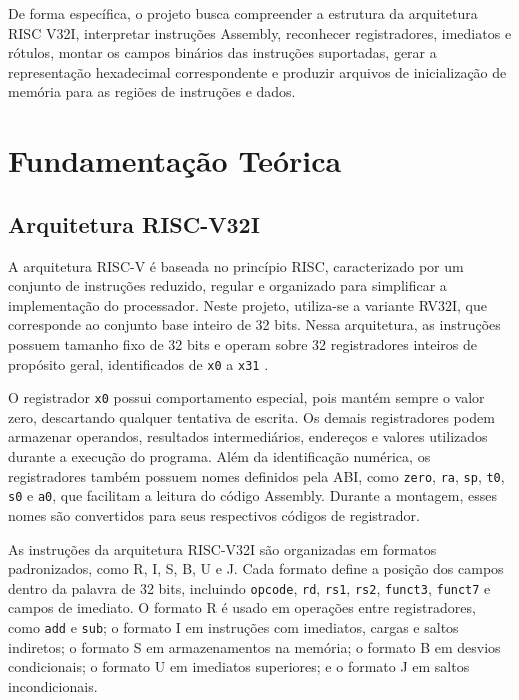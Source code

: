 \documentclass[conference]{IEEEtran}
\begin{document}
De forma espec\'{i}fica, o projeto busca compreender a estrutura da arquitetura RISC V32I, interpretar instru\c{c}\~{o}es Assembly, reconhecer registradores, imediatos e r\'{o}tulos, montar os campos bin\'{a}rios das instru\c{c}\~{o}es suportadas, gerar a representa\c{c}\~{a}o hexadecimal correspondente e produzir arquivos de inicializa\c{c}\~{a}o de mem\'{o}ria para as regi\~{o}es de instru\c{c}\~{o}es e dados.


\section{Fundamentação Teórica}

\subsection{Arquitetura RISC-V32I}

A arquitetura RISC-V é baseada no princípio RISC, caracterizado por um conjunto de instruções reduzido, regular e organizado para simplificar a implementação do processador. Neste projeto, utiliza-se a variante RV32I, que corresponde ao conjunto base inteiro de 32 bits. Nessa arquitetura, as instruções possuem tamanho fixo de 32 bits e operam sobre 32 registradores inteiros de propósito geral, identificados de \texttt{x0} a \texttt{x31} \cite{riscv-spec}.

O registrador \texttt{x0} possui comportamento especial, pois mantém sempre o valor zero, descartando qualquer tentativa de escrita. Os demais registradores podem armazenar operandos, resultados intermediários, endereços e valores utilizados durante a execução do programa. Além da identificação numérica, os registradores também possuem nomes definidos pela ABI, como \texttt{zero}, \texttt{ra}, \texttt{sp}, \texttt{t0}, \texttt{s0} e \texttt{a0}, que facilitam a leitura do código Assembly. Durante a montagem, esses nomes são convertidos para seus respectivos códigos de registrador.

As instruções da arquitetura RISC-V32I são organizadas em formatos padronizados, como R, I, S, B, U e J. Cada formato define a posição dos campos dentro da palavra de 32 bits, incluindo \texttt{opcode}, \texttt{rd}, \texttt{rs1}, \texttt{rs2}, \texttt{funct3}, \texttt{funct7} e campos de imediato. O formato R é usado em operações entre registradores, como \texttt{add} e \texttt{sub}; o formato I em instruções com imediatos, cargas e saltos indiretos; o formato S em armazenamentos na memória; o formato B em desvios condicionais; o formato U em imediatos superiores; e o formato J em saltos incondicionais.
\end{document}

